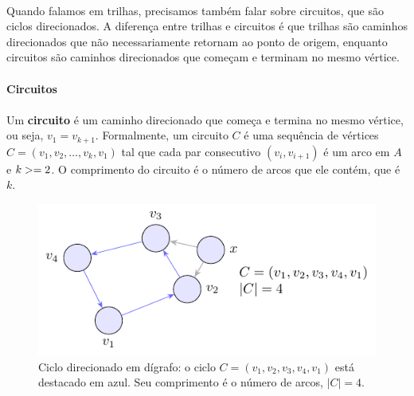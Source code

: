 \documentclass[12pt,a4paper]{article}
\def\geq{\string>=}%
\begin{document}
\paragraph{}
Quando falamos em trilhas, precisamos também falar sobre circuitos, que são ciclos direcionados.
A diferença entre trilhas e circuitos é que trilhas são caminhos direcionados que não necessariamente retornam ao ponto de origem, enquanto circuitos são caminhos direcionados que começam e terminam no mesmo vértice.

\paragraph{Circuitos}
\paragraph{}
Um \textbf{circuito} é um caminho direcionado que começa e termina no mesmo vértice, ou seja, \(v_1 = v_{k+1}\). Formalmente, um circuito \(C\) é uma sequência de vértices \(C = (v_1, v_2, \ldots, v_k, v_1)\) tal que cada par consecutivo \((v_i, v_{i+1})\) é um arco em \(A\) e \(k \geq 2\). O comprimento do circuito é o número de arcos que ele contém, que é \(k\).


\begin{figure}[H]
    \centering
    \includegraphics[width=0.9\linewidth]{figures/fig_ciclo_direcionado.pdf}

    \caption{Ciclo direcionado em dígrafo: o ciclo $C=(v_1,v_2,v_3,v_4,v_1)$ está destacado em azul. Seu comprimento é o número de arcos, $|C|=4$.}
    \label{fig:ciclo-direcionado}\end{figure}
\end{document}
